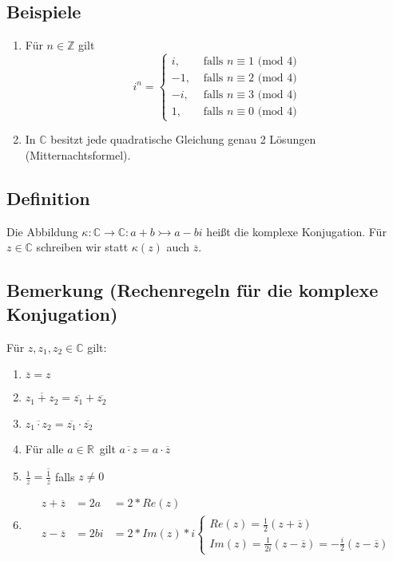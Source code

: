 \subsection{Beispiele}
\begin{enumerate}
	\item Für $n \in \mathbb{Z}$ gilt
	\[i^n = \begin{cases}
	i,  &\text{ falls } n \equiv 1 \text{ (mod 4)}\\
	-1, &\text{ falls } n \equiv 2 \text{ (mod 4)}\\
	-i, &\text{ falls } n \equiv 3 \text{ (mod 4)}\\
	1,  &\text{ falls } n \equiv 0 \text{ (mod 4)}
	\end{cases} \]

	\item In $\mathbb{C}$ besitzt jede quadratische Gleichung genau 2 Lösungen (Mitternachtsformel).
\end{enumerate}

\subsection{Definition}
Die Abbildung $\kappa: \mathbb{C} \rightarrow \mathbb{C}: a+b \rightarrowtail a-bi$ heißt die komplexe Konjugation.
Für $z \in \mathbb{C}$ schreiben wir statt $\kappa(z)$ auch $\overline{z}$.

\subsection{Bemerkung (Rechenregeln für die komplexe Konjugation)}
\label{sec:regeln-komplexe}
Für $z, z_1, z_2 \in \mathbb{C}$ gilt:
\begin{enumerate}
\item $\overline{z} = z$
\item $\overline{z_1 + z_2} = \overline{z_1} + \overline{z_2}$
\item $\overline{z_1 \cdot z_2} = \overline{z_1} \cdot \overline{z_2}$
\item Für alle $a \in \mathbb{R}$ gilt $\overline{a \cdot z} = a \cdot \overline{z}$
\item $\frac{1}{\overline{z}} = \overline{\frac{1}{z}}$ falls $z \neq 0$
\item
	\begin{align}
	z + \overline{z} &= 2 a &= 2 * Re(z)\\
	z - \overline{z} &= 2 bi &= 2 * Im(z) * i
	\begin{cases}
	Re(z) = \frac{1}{2}(z + \overline{z}) \\
	Im(z) = \frac{1}{2i}(z - \overline{z}) = -\frac{i}{2}(z - \overline{z})
	\end{cases}
	\end{align}
\end{enumerate}

